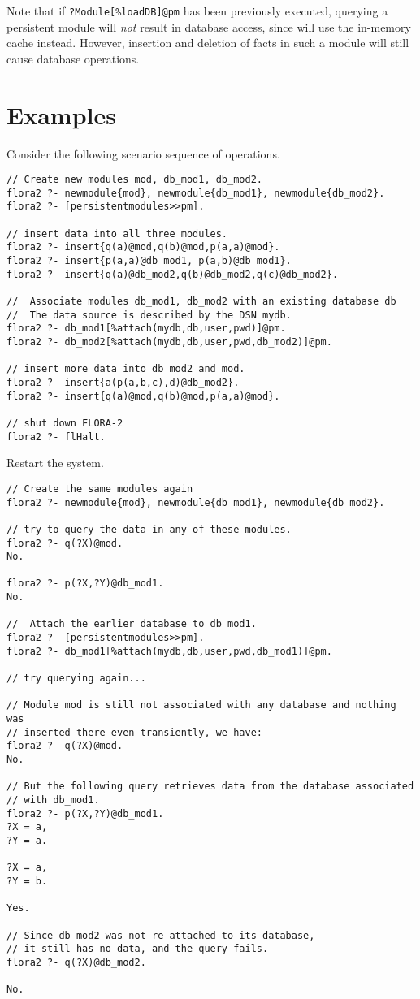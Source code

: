 Note that if {\tt ?Module[\%loadDB]@pm} has been previously executed,
querying a persistent module will \emph{not} result in database access,
since \FLORA will use the in-memory cache instead. However, insertion and
deletion of facts in such a module will still cause database
operations.

\section{Examples}

Consider the following scenario sequence of operations.

\begin{verbatim}
// Create new modules mod, db_mod1, db_mod2.
flora2 ?- newmodule{mod}, newmodule{db_mod1}, newmodule{db_mod2}.
flora2 ?- [persistentmodules>>pm].

// insert data into all three modules.
flora2 ?- insert{q(a)@mod,q(b)@mod,p(a,a)@mod}.
flora2 ?- insert{p(a,a)@db_mod1, p(a,b)@db_mod1}.
flora2 ?- insert{q(a)@db_mod2,q(b)@db_mod2,q(c)@db_mod2}.

//  Associate modules db_mod1, db_mod2 with an existing database db
//  The data source is described by the DSN mydb.
flora2 ?- db_mod1[%attach(mydb,db,user,pwd)]@pm.
flora2 ?- db_mod2[%attach(mydb,db,user,pwd,db_mod2)]@pm.

// insert more data into db_mod2 and mod.
flora2 ?- insert{a(p(a,b,c),d)@db_mod2}.
flora2 ?- insert{q(a)@mod,q(b)@mod,p(a,a)@mod}.

// shut down FLORA-2
flora2 ?- flHalt.
\end{verbatim}

\noindent
Restart the \FLORA system.

\begin{verbatim}
// Create the same modules again
flora2 ?- newmodule{mod}, newmodule{db_mod1}, newmodule{db_mod2}.

// try to query the data in any of these modules.
flora2 ?- q(?X)@mod.
No.

flora2 ?- p(?X,?Y)@db_mod1.
No.

//  Attach the earlier database to db_mod1.
flora2 ?- [persistentmodules>>pm].
flora2 ?- db_mod1[%attach(mydb,db,user,pwd,db_mod1)]@pm.

// try querying again...

// Module mod is still not associated with any database and nothing was
// inserted there even transiently, we have:
flora2 ?- q(?X)@mod.
No.

// But the following query retrieves data from the database associated
// with db_mod1.
flora2 ?- p(?X,?Y)@db_mod1.
?X = a,
?Y = a.

?X = a,
?Y = b.

Yes.

// Since db_mod2 was not re-attached to its database,
// it still has no data, and the query fails.
flora2 ?- q(?X)@db_mod2.

No.
\end{verbatim}



